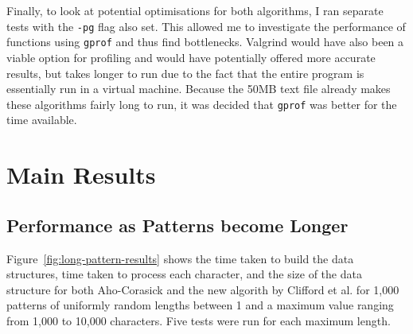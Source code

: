 \documentclass[ %
                    author={Dominic Joseph Moylett},
                    degree={MEng},
                     title={Dictionary Matching with Fingerprints},
                  subtitle={An Empirical Analysis},
                      type={research},
                      year={2015} ]{dissertation}
\begin{document}
Finally, to look at potential optimisations for both algorithms, I ran separate tests with the \texttt{-pg} flag also set. This allowed me to investigate the performance of functions using \texttt{gprof} and thus find bottlenecks. Valgrind would have also been a viable option for profiling and would have potentially offered more accurate results, but takes longer to run due to the fact that the entire program is essentially run in a virtual machine. Because the 50MB text file already makes these algorithms fairly long to run, it was decided that \texttt{gprof} was better for the time available.

\section{Main Results}

\subsection{Performance as Patterns become Longer}
\label{ssec:long-pattern-results}

Figure~\ref{fig:long-pattern-results} shows the time taken to build the data structures, time taken to process each character, and the size of the data structure for both Aho-Corasick and the new algorith by Clifford et al. for 1,000 patterns of uniformly random lengths between 1 and a maximum value ranging from 1,000 to 10,000 characters. Five tests were run for each maximum length.
\end{document}
